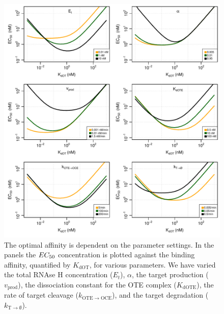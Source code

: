 \documentclass[a4paper,11pt]{article}
\newenvironment{Ncenter}{%
  \setlength\topsep{-10pt}
  \setlength\parskip{-10pt}
  \begin{center}
}{%
  \end{center}
}
\newcommand{\kE}{k_{\mathrm{OTE \to OCE}}}
\newcommand{\vp}{v_{\mathrm{prod}}}
\newcommand{\vd}{k_{\mathrm{T \to \emptyset}}}
\newcommand{\EC}{EC_{\rm{50}}}
\newcommand{\KdOT}{K_{\mathrm{dOT}}}
\newcommand{\KdOTE}{K_{\mathrm{dOTE}}}
\begin{document}
\begin{figure}[!h]
\begin{Ncenter}
\includegraphics[width=\textwidth]{SuppFile1-S2.pdf}
\end{Ncenter}
\caption{The optimal affinity is dependent on the parameter settings. In the panels the $\EC$ concentration is plotted against the binding affinity, quantified by $\KdOT$, for various parameters. We have varied the total RNAse H concentration ($E_t$), $\alpha$, the target production ($\vp$), the dissociation constant for the OTE complex ($\KdOTE$), the rate of target cleavage ($\kE$),  and the target degradation ($\vd$).}\label{fig::Opt}
\end{figure}


\end{document}
